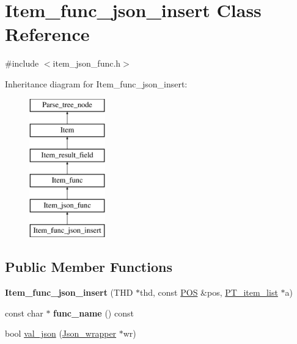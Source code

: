 \hypertarget{classItem__func__json__insert}{}\section{Item\+\_\+func\+\_\+json\+\_\+insert Class Reference}
\label{classItem__func__json__insert}


{\ttfamily \#include $<$item\+\_\+json\+\_\+func.\+h$>$}

Inheritance diagram for Item\+\_\+func\+\_\+json\+\_\+insert\+:\begin{figure}[H]
\begin{center}
\leavevmode
\includegraphics[height=6.000000cm]{classItem__func__json__insert}
\end{center}
\end{figure}
\subsection*{Public Member Functions}
\begin{DoxyCompactItemize}
\item 
\mbox{\label{classItem__func__json__insert_a2a15dd2e825917b44afe1c8dd868ed1a}} 
{\bfseries Item\+\_\+func\+\_\+json\+\_\+insert} (T\+HD $\ast$thd, const \mbox{\hyperlink{structYYLTYPE}{P\+OS}} \&pos, \mbox{\hyperlink{classPT__item__list}{P\+T\+\_\+item\+\_\+list}} $\ast$a)
\item 
\mbox{\label{classItem__func__json__insert_a56c871cd44659f08896b1fccb7bf92ae}} 
const char $\ast$ {\bfseries func\+\_\+name} () const
\item 
bool \mbox{\hyperlink{classItem__func__json__insert_a45b5b362fcea87f93083500e8c805609}{val\+\_\+json}} (\mbox{\hyperlink{classJson__wrapper}{Json\+\_\+wrapper}} $\ast$wr)
\end{DoxyCompactItemize}
